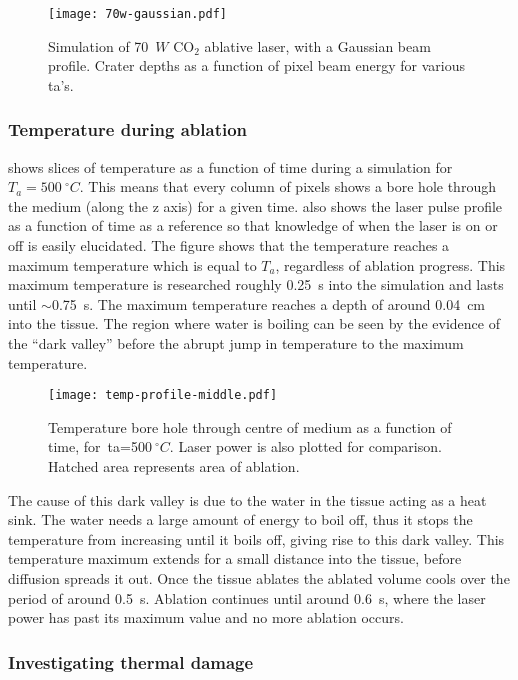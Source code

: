  \begin{figure}[!htbp]
	\centering
    \texttt{[image: 70w-gaussian.pdf]}
    \caption{Simulation of 70~$W$ CO$_2$ ablative laser, with a Gaussian beam profile. Crater depths as a function of pixel beam energy for various \gls*{ta}'s.}
    \label{fig:tagauss}
\end{figure}

\subsubsection*{Temperature during ablation}

 shows slices of temperature as a function of time during a simulation for $T_a=500~^{\circ}C$.
This means that every column of pixels shows a bore hole through the medium (along the z axis) for a given time.
 also shows the laser pulse profile as a function of time as a reference so that knowledge of when the laser is on or off is easily elucidated.
The figure shows that the temperature reaches a maximum temperature which is equal to $T_a$, regardless of ablation progress.
This maximum temperature is researched roughly 0.25~s into the simulation and lasts until $\sim$0.75~s.
The maximum temperature reaches a depth of around 0.04~cm into the tissue.
The region where water is boiling can be seen by the evidence of the ``dark valley'' before the abrupt jump in temperature to the maximum temperature.
\begin{figure}[!htbp]
	\centering
	\texttt{[image: temp-profile-middle.pdf]}
	\caption{Temperature bore hole through centre of medium as a function of time, for~\gls*{ta}=500$~^{\circ}C$. Laser power is also plotted for comparison. Hatched area represents area of ablation.}
	\label{fig:temp-500profile}
\end{figure}

The cause of this dark valley is due to the water in the tissue acting as a heat sink.
The water needs a large amount of energy to boil off, thus it stops the temperature from increasing until it boils off, giving rise to this dark valley.
This temperature maximum extends for a small distance into the tissue, before diffusion spreads it out.
Once the tissue ablates the ablated volume cools over the period of around 0.5~s.
Ablation continues until around 0.6~s, where the laser power has past its maximum value and no more ablation occurs.

\subsubsection*{Investigating thermal damage} 

